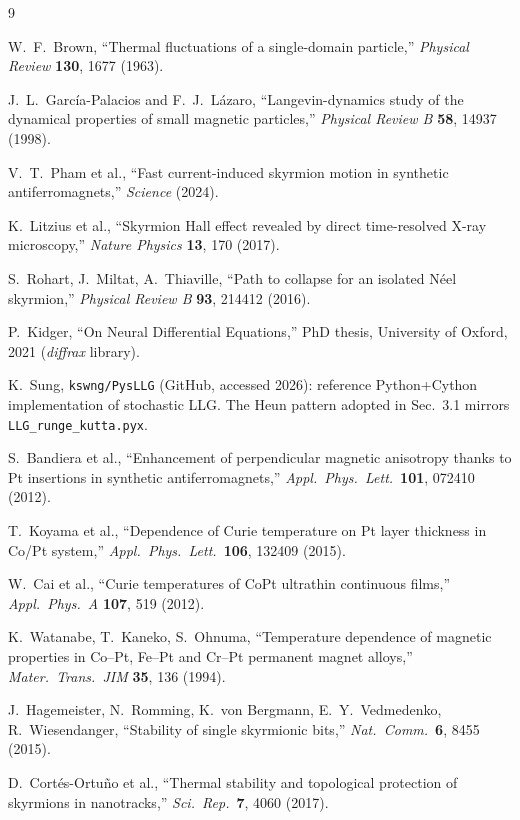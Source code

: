 \documentclass[11pt,a4paper]{article}
\begin{document}
\begin{thebibliography}{9}

W.~F.~Brown, ``Thermal fluctuations of a single-domain particle,''
\emph{Physical Review} \textbf{130}, 1677 (1963).

J.~L.~Garc\'ia-Palacios and F.~J.~L\'azaro,
``Langevin-dynamics study of the dynamical properties of small
magnetic particles,''
\emph{Physical Review B} \textbf{58}, 14937 (1998).

V.~T.~Pham et al., ``Fast current-induced skyrmion motion in
synthetic antiferromagnets,'' \emph{Science} (2024).

K.~Litzius et al., ``Skyrmion Hall effect revealed by direct
time-resolved X-ray microscopy,'' \emph{Nature Physics} \textbf{13},
170 (2017).

S.~Rohart, J.~Miltat, A.~Thiaville,
``Path to collapse for an isolated N\'eel skyrmion,''
\emph{Physical Review B} \textbf{93}, 214412 (2016).

P.~Kidger, ``On Neural Differential Equations,'' PhD thesis,
University of Oxford, 2021 (\emph{diffrax} library).

K.~Sung, \texttt{kswng/PysLLG} (GitHub, accessed 2026): reference
Python+Cython implementation of stochastic LLG. The Heun pattern
adopted in Sec.~3.1 mirrors \texttt{LLG\_runge\_kutta.pyx}.

S.~Bandiera et al., ``Enhancement of perpendicular magnetic
anisotropy thanks to Pt insertions in synthetic antiferromagnets,''
\emph{Appl.\ Phys.\ Lett.}\ \textbf{101}, 072410 (2012).

T.~Koyama et al., ``Dependence of Curie temperature on Pt layer
thickness in Co/Pt system,'' \emph{Appl.\ Phys.\ Lett.}\ \textbf{106},
132409 (2015).

W.~Cai et al., ``Curie temperatures of CoPt ultrathin continuous
films,'' \emph{Appl.\ Phys.\ A} \textbf{107}, 519 (2012).

K.~Watanabe, T.~Kaneko, S.~Ohnuma, ``Temperature dependence of
magnetic properties in Co--Pt, Fe--Pt and Cr--Pt permanent magnet
alloys,'' \emph{Mater.\ Trans.\ JIM} \textbf{35}, 136 (1994).

J.~Hagemeister, N.~Romming, K.~von Bergmann, E.~Y.~Vedmedenko,
R.~Wiesendanger, ``Stability of single skyrmionic bits,''
\emph{Nat.\ Comm.}\ \textbf{6}, 8455 (2015).

D.~Cort\'es-Ortu\~{n}o et al., ``Thermal stability and topological
protection of skyrmions in nanotracks,'' \emph{Sci.\ Rep.}\
\textbf{7}, 4060 (2017).

\end{thebibliography}
\end{document}
